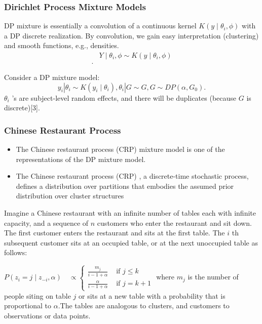 \documentclass[11pt]{beamer}
\begin{document}
	
	\begin{frame}
		\frametitle{Dirichlet Process Mixture Models}
DP mixture is essentially a convolution of a continuous kernel $K\left(y \mid \theta_i, \phi\right)$
		with a DP discrete realization. By convolution, we gain easy
		interpretation (clustering) and smooth functions, e.g., densities.
$$
\begin{aligned}
	& Y \mid \theta_i, \phi \sim K\left(y \mid \theta_i, \phi\right) \\.
\end{aligned}
$$


Consider a DP mixture model:
$$
y_i\left|\theta_i \sim K\left(y_i \mid \theta_i\right), \theta_i\right| G \sim G, G \sim D P\left(\alpha, G_0\right) .
$$
$\theta_i$ 's are subject-level random effects, and there will be duplicates (because $G$ is discrete)[3].
		

	\end{frame}
	
	
	\begin{frame}
		\frametitle{Chinese Restaurant Process}
		\begin{itemize}
			\item The Chinese restaurant process (CRP)  mixture model is
			one of the representations of the DP mixture model.
			\item The Chinese restaurant process (CRP) , a discrete-time
			stochastic process, defines a distribution over partitions that embodies the assumed prior distribution over cluster structures
		\end{itemize}
 Imagine a Chinese restaurant with an infinite number of tables each with infinite capacity, and a sequence of $n$ customers who enter the restaurant and sit down. The first customer enters the restaurant and sits at the first table. The $i$ th subsequent customer sits at an occupied table, or at the next unoccupied table as follows:


$
P\left(z_i=j \mid z_{-i}, \alpha\right) \quad \propto \begin{cases}\frac{m_j}{i-1+\alpha} & \text { if } j \leq k \\ \frac{\alpha}{i-1+\alpha} & \text { if } j=k+1\end{cases}
$
where $m_j$ is the number of people siting  on table $j$ or sits at a new table with a probability that is proportional to $\alpha$.The tables are analogous
to clusters, and customers to observations or data points.
	\end{frame}
	
\end{document}
